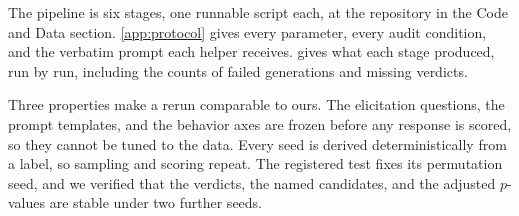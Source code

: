 The pipeline is six stages, one runnable script each, at the repository in the Code and Data section.
\autoref{app:protocol} gives every parameter, every audit condition, and the verbatim prompt each helper receives.
\datasupp{} gives what each stage produced, run by run, including the counts of failed generations and missing verdicts.

Three properties make a rerun comparable to ours.
The elicitation questions, the prompt templates, and the behavior axes are frozen before any response is scored, so they cannot be tuned to the data.
Every seed is derived deterministically from a label, so sampling and scoring repeat.
The registered test fixes its permutation seed, and we verified that the verdicts, the named candidates, and the adjusted $p$-values are stable under two further seeds.
